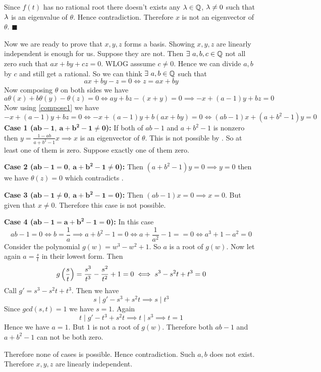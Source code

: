 \documentclass[a4paper, 11pt]{article}
\renewenvironment{proof}{\noindent{\it \textbf{Proof:}}\hspace*{1em}}{\hfill $\blacksquare$\bigskip\\}
\begin{document}
{\begin{proof}
	Since $f(t)$ has no rational root there doesn't exists any $\lambda\in\mathbb{Q}$, $\lambda\neq 0$ such that $\lambda$ is an eigenvalue of $\theta$. Hence contradiction. Therefore $x$ is not an eigenvector of $\theta$. 
\end{proof}

Now we are ready to prove that $x,y,z$ forms a basis. Showing $x,y,z$ are linearly independent is enough for us. Suppose they are not. Then $\exists\ a,b,c\in \mathbb{Q}$  not all zero such that $ax+by+cz=0$. WLOG asssume $c\neq 0$. Hence we can divide $a,b$ by $c$ and still get a rational. So we can think $\exists\ a,b\in \mathbb{Q}$ such that $$ax+by-z=0\iff z=ax+by$$ Now composing $\theta$ on both sides we have \begin{equation}
	a\theta(x)+b\theta(y)-\theta(z)=0\iff ay+bz-(x+y)=0\implies {-x+(a-1)y+bz=0}\label{compose1}
\end{equation}Now using \eqref{compose1} we have $$-x+(a-1)y+bz=0\iff -x+(a-1)y+b({ax+by})=0\iff (ab-1)x+(a+b^2-1)y=0$$\textbf{Case 1 ($\boldsymbol{ab-1,\ a+b^2-1\neq 0}$):} If both of $ab-1$ and $a+b^2-1$ is nonzero then $y=\frac{1-ab}{a+b^2-1}x\implies x$ is an eigenvector of $\theta$. This is not possible by .  So at least one of them is zero. Suppose exactly one of them zero.\vspace*{2mm} \parinf

\textbf{Case 2 ($\boldsymbol{ab-1=0,\ a+b^2-1\neq 0}$):} Then $(a+b^2-1)y=0\implies y=0$ then we have $ \theta(z)=0$ which contradicts .\vspace*{2mm}

\textbf{Case 3 ($\boldsymbol{ab-1\neq0,\ a+b^2-1= 0}$):} Then $(ab-1)x=0\implies x=0$. But given that $x\neq0$. Therefore this case is not possible.\vspace*{2mm}

\textbf{Case 4 ($\boldsymbol{ab-1=a+b^2-1=0}$):} In this case$$ab-1=0\iff b=\frac1a\implies a+b^2-1=0\iff a+\frac1{a^2}-1==0\iff a^3+1-a^2=0$$Consider the polynomial $g(w)=w^3-w^2+1$. So $a$ is a root of $g(w)$. Now let again $a=\frac{s}{t}$ in their lowest form. Then $$g\left(\frac{s}{t}\right)=\frac{s^3}{t^3}-\frac{s^2}{t^2}+1=0\iff s^3-s^2t+t^3=0$$Call $g'= s^3-s^2t+t^3$. Then we have $$s\mid g'-s^3+s^2t\implies s\mid t^3$$Since $gcd(s,t)=1$ we have $s=1$. Again $$t\mid g'-t^3+s^2t\implies t\mid s^3\implies t=1$$Hence we have $a=1$. But $1$ is not a root of $g(w)$. Therefore both $ab-1$ and $a+b^2-1$ can not be both zero. \parinn\vspace*{5mm}

Therefore none of cases is possible. Hence contradiction. Such $a,b$ does not exist. Therefore $x,y,z$ are linearly independent. 
}
\pagebreak
\end{document}
